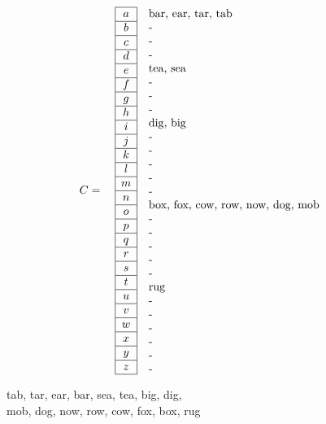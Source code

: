 \documentclass{article}
\begin{document}
\[
C = \quad
\begin{array}{|c|}
\hline
a \\ \hline
b \\ \hline
c \\ \hline
d \\ \hline
e \\ \hline
f \\ \hline
g \\ \hline
h \\ \hline
i \\ \hline
j \\ \hline
k \\ \hline
l \\ \hline
m \\ \hline
n \\ \hline
o \\ \hline
p \\ \hline
q \\ \hline
r \\ \hline
s \\ \hline
t \\ \hline
u \\ \hline
v \\ \hline
w \\ \hline
x \\ \hline
y \\ \hline
z \\ \hline
\end{array}
\quad
\begin{minipage}{6cm}
\raggedright %
bar, ear, tar, tab\\%
-\\%
-\\%
-\\%
tea, sea\\%
-\\%
-\\%
-\\%
dig, big\\%
-\\%
-\\%
-\\%
-\\%
-\\%
box, fox, cow, row, now, dog, mob\\%
-\\%
-\\%
-\\%
-\\%
-\\%
rug\\%
-\\
-\\%
-\\%
-\\%
-\\%
-\\%
\end{minipage}
\]
\begin{center}
    tab, tar, ear, bar, sea, tea, big, dig,\\
    mob, dog, now, row, cow, fox, box, rug
\end{center}
\end{document}
